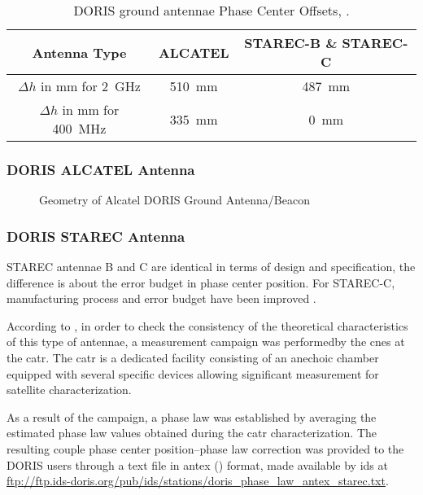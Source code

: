 \begin{table}[h!]
    \centering
    \begin{tabular}{|c|c|c|}
        \hline
        \textbf{Antenna Type} & \textbf{ALCATEL} & \textbf{STAREC-B} \& \textbf{STAREC-C} \\
        \hline
        $\Delta h$ in \si{\mm} for \SI{2}{\GHz} & \SI{510}{\mm} & \SI{487}{\mm}\\
        $\Delta h$ in \si{\mm} for \SI{400}{\MHz} & \SI{335}{\mm} & \SI{0}{\mm}\\
        \hline
    \end{tabular}
    \caption{DORIS ground antennae Phase Center Offsets, \cite{DORISGSM}.}
    \label{table:antenna-pco}
\end{table}

\subsubsection{DORIS ALCATEL Antenna}\label{sssec:doris-alcatel}
\begin{figure}
\centering

\caption{Geometry of Alcatel DORIS Ground Antenna/Beacon}
\label{fig:alcatel-antenna}
\end{figure}


\subsubsection{DORIS STAREC Antenna}\label{sssec:doris-starec}
STAREC antennae B and C are identical in terms of design and specification, the
difference is about the error budget in phase center position. For STAREC-C,
manufacturing process and error budget have been improved \cite{DORISGSM}.

According to \cite{TOURAIN2016}, in order to check the consistency of the theoretical 
characteristics of this type of antennae, a measurement campaign was performedby 
the \gls{cnes} at the \gls{catr}. The \gls{catr} is a dedicated facility 
consisting of an anechoic chamber equipped with several specific devices 
allowing significant measurement for satellite characterization.

As a result of the campaign, a phase law was established by averaging the 
estimated phase law values obtained during the \gls{catr} characterization. 
The resulting couple phase center position–phase law correction was provided 
to the DORIS users through a text file in \gls{antex} (\cite{ANTEXv14}) format, 
made available by \gls{ids} at 
\url{ftp://ftp.ids-doris.org/pub/ids/stations/doris_phase_law_antex_starec.txt}.

